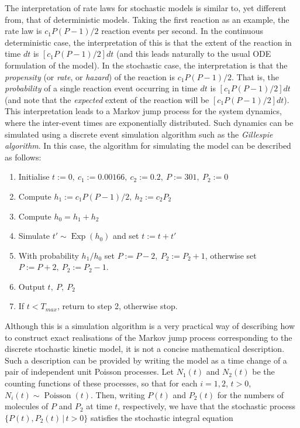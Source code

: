 \clearpage

The interpretation of rate laws for stochastic models is similar
to, yet different from, that of deterministic models. Taking the
first reaction as an example, the rate law is $c_1P(P-1)/2$ reaction
events per second. In the continuous deterministic case, the
interpretation of this is that the extent of the reaction in time
$dt$ is $[c_1P(P-1)/2]dt$ (and this leads naturally to the usual ODE
formulation of the model). In the stochastic case, the
interpretation is that the \emph{propensity} (or \emph{rate}, or
\emph{hazard}) of the reaction is $c_1P(P-1)/2$. That is, the
\emph{probability} of a single reaction event occurring in time
$dt$ is $[c_1P(P-1)/2]dt$ (and note that the \emph{expected} extent of
the reaction will be $[c_1P(P-1)/2]dt$). This interpretation leads to a Markov
jump process for the system dynamics, where the inter-event times
are exponentially distributed. Such dynamics can be simulated
using a discrete event simulation algorithm such as the
\emph{Gillespie algorithm}. In this case, the algorithm for
simulating the model can be described as follows:
\begin{enumerate}
\item Initialise $t:=0,\ c_1:=0.00166,\ c_2:=0.2,\ P:=301,\ P_2:=0$
\item Compute $h_1:=c_1P(P-1)/2,\ h_2:=c_2P_2$
\item Compute $h_0=h_1+h_2$
\item Simulate $t'\sim \operatorname{Exp}(h_0)$ and set $t:=t+t'$
\item With probability $h_1/h_0$ set $P:=P-2,\ P_2:=P_2+1$,
otherwise set $P:=P+2,\ P_2:=P_2-1$.
\item Output $t,\ P,\ P_2$
\item If $t<T_{max}$, return to step 2, otherwise stop.
\end{enumerate}
Although this is a simulation algorithm is a very practical way of
describing how to construct exact realisations of the Markov jump
process corresponding to the discrete stochastic kinetic model, it
is not a concise mathematical description. Such a description can
be provided by writing the model as a time change of a pair of
independent unit Poisson processes. Let $N_1(t)$ and $N_2(t)$ be
the counting functions of these processes, so that for each
$i=1,2$, $t>0$, $N_i(t)\sim \operatorname{Poisson}(t)$. Then,
writing $P(t)$ and $P_2(t)$ for the numbers of molecules of $P$
and $P_2$ at time $t$, respectively, we have that the stochastic process
$\{P(t),P_2(t)\,|\,t>0\}$ satisfies the stochastic integral equation
